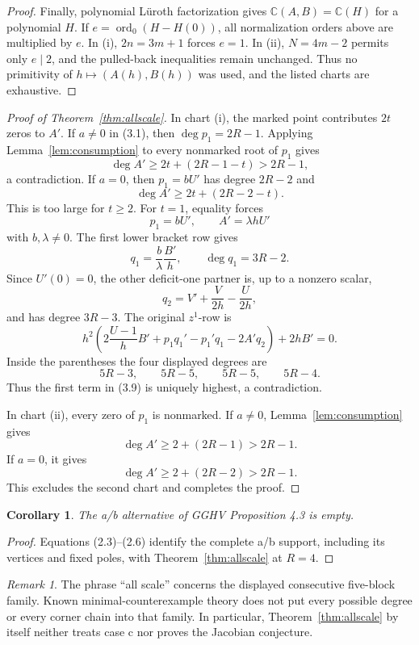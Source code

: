 \documentclass[11pt]{article}
\newtheorem{corollary}[theorem]{Corollary}
\theoremstyle{definition}
\theoremstyle{remark}
\newtheorem{remark}[theorem]{Remark}
\newcommand{\ord}{\operatorname{ord}}
\begin{document}
\begin{proof}
Finally, polynomial L\"uroth factorization gives
\(\mathbb C(A,B)=\mathbb C(H)\) for a polynomial \(H\).  If
\(e=\ord_0(H-H(0))\), all normalization orders above are multiplied by
\(e\).  In (i), \(2n=3m+1\) forces \(e=1\).  In (ii),
\(N=4m-2\) permits only \(e\mid2\), and the pulled-back inequalities
remain unchanged.  Thus no primitivity of \(h\mapsto(A(h),B(h))\) was
used, and the listed charts are exhaustive.
\end{proof}

\begin{proof}[Proof of Theorem~\ref{thm:allscale}]
In chart (i), the marked point contributes \(2t\) zeros to \(A'\).
If \(a\ne0\) in (3.1), then \(\deg p_1=2R-1\).  Applying
Lemma~\ref{lem:consumption} to every nonmarked root of \(p_1\) gives
\[
 \deg A'\ge2t+(2R-1-t)>2R-1,
\]
a contradiction.  If \(a=0\), then \(p_1=bU'\) has degree \(2R-2\)
and
\[
 \deg A'\ge2t+(2R-2-t).
\]
This is too large for \(t\ge2\).  For \(t=1\), equality forces
\[
 p_1=bU',\qquad A'=\lambda hU'
\]
with \(b,\lambda\ne0\).  The first lower bracket row gives
\[
 q_1=\frac b\lambda\frac{B'}h,\qquad \deg q_1=3R-2.
\]
Since \(U'(0)=0\), the other deficit-one partner is, up to a nonzero
scalar,
\[
 q_2=V'+\frac{V}{2h}-\frac{U}{2h},
\]
and has degree \(3R-3\).
The original \(z^1\)-row is
\[
h^2\left(
2\frac{U-1}{h}B'+p_1q_1'-p_1'q_1-2A'q_2
\right)+2hB'=0.                                       \tag{3.9}
\]
Inside the parentheses the four displayed degrees are
\[
5R-3,\qquad5R-5,\qquad5R-5,\qquad5R-4.
\]
Thus the first term in (3.9) is uniquely highest, a contradiction.

In chart (ii), every zero of \(p_1\) is nonmarked.  If \(a\ne0\),
Lemma~\ref{lem:consumption} gives
\[
\deg A'\ge2+(2R-1)>2R-1.
\]
If \(a=0\), it gives
\[
\deg A'\ge2+(2R-2)>2R-1.
\]
This excludes the second chart and completes the proof.
\end{proof}

\begin{corollary}\label{cor:ab}
The a/b alternative of GGHV Proposition 4.3 is empty.
\end{corollary}

\begin{proof}
Equations (2.3)--(2.6) identify the complete a/b support, including its
vertices and fixed poles, with Theorem~\ref{thm:allscale} at \(R=4\).
\end{proof}

\begin{remark}
The phrase ``all scale'' concerns the displayed consecutive five-block
family.  Known minimal-counterexample theory does not put every
possible degree or every corner chain into that family.  In particular,
Theorem~\ref{thm:allscale} by itself neither treats case c nor proves the
Jacobian conjecture.
\end{remark}
\end{document}
